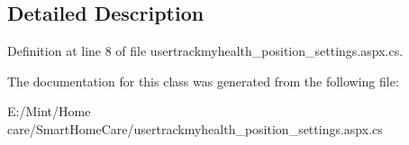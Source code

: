 \subsection{Detailed Description}


Definition at line 8 of file usertrackmyhealth\-\_\-position\-\_\-settings.\-aspx.\-cs.



The documentation for this class was generated from the following file\-:\begin{DoxyCompactItemize}
\item 
E\-:/\-Mint/\-Home care/\-Smart\-Home\-Care/usertrackmyhealth\-\_\-position\-\_\-settings.\-aspx.\-cs\end{DoxyCompactItemize}
